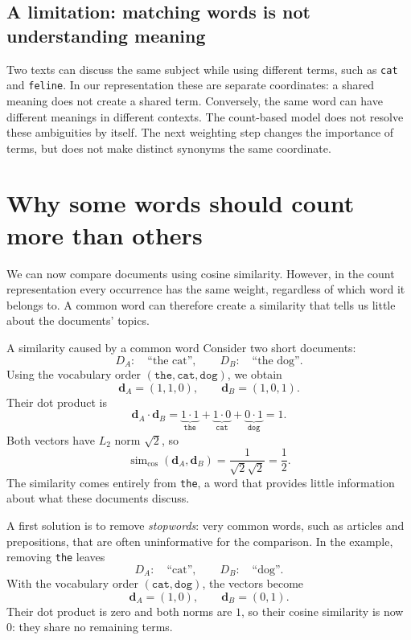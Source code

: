 \documentclass[a4paper,12pt,oneside]{report}
\begin{document}
\subsection{A limitation: matching words is not understanding meaning}

Two texts can discuss the same subject while using different terms,
such as \texttt{cat} and \texttt{feline}. In our representation these
are separate coordinates: a shared meaning does not create a shared
term. Conversely, the same word can have different meanings in
different contexts. The count-based model does not resolve these
ambiguities by itself. The next weighting step changes the importance
of terms, but does not make distinct synonyms the same coordinate.

\section{Why some words should count more than others}

We can now compare documents using cosine similarity. However, in
the count representation every occurrence has the same weight,
regardless of which word it belongs to. A common word can therefore
create a similarity that tells us little about the documents' topics.

\begin{framedexample}{A similarity caused by a common word}
Consider two short documents:
\[
  D_A:\quad\text{``the cat''},\qquad
  D_B:\quad\text{``the dog''}.
\]
Using the vocabulary order $(\texttt{the},\texttt{cat},\texttt{dog})$,
we obtain
\[
  \mathbf d_A=(1,1,0),\qquad\mathbf d_B=(1,0,1).
\]
Their dot product is
\[
  \mathbf d_A\cdot\mathbf d_B
  =\underbrace{1\cdot1}_{\texttt{the}}
   +\underbrace{1\cdot0}_{\texttt{cat}}
   +\underbrace{0\cdot1}_{\texttt{dog}}=1.
\]
Both vectors have $L_2$ norm $\sqrt2$, so
\[
  \operatorname{sim}_{\cos}(\mathbf d_A,\mathbf d_B)
  =\frac{1}{\sqrt2\sqrt2}=\frac12.
\]
The similarity comes entirely from \texttt{the}, a word that provides
little information about what these documents discuss.
\end{framedexample}

A first solution is to remove \emph{stopwords}: very common words,
such as articles and prepositions, that are often uninformative for
the comparison. In the example, removing \texttt{the} leaves
\[
  D_A:\quad\text{``cat''},\qquad D_B:\quad\text{``dog''}.
\]
With the vocabulary order $(\texttt{cat},\texttt{dog})$, the vectors
become
\[
  \mathbf d_A=(1,0),\qquad\mathbf d_B=(0,1).
\]
Their dot product is zero and both norms are $1$, so their cosine
similarity is now $0$: they share no remaining terms.
\end{document}
